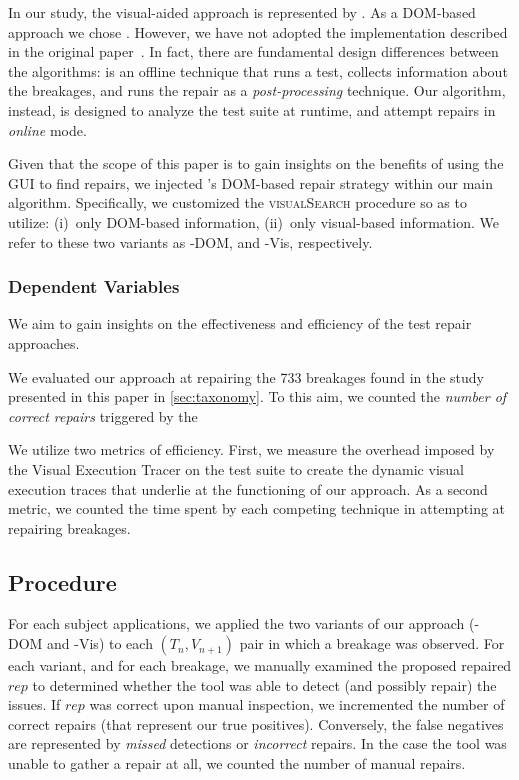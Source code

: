 In our study, the visual-aided approach is represented by \tool. As a DOM-based approach we chose \water. However, we have not adopted the implementation described in the original paper~\cite{Choudhary:2011:WWA:2002931.2002935}. In fact, there are fundamental design differences between the algorithms: \water is an offline technique that runs a test, collects information about the breakages, and runs the repair as a \textit{post-processing} technique. Our algorithm, instead, is designed to analyze the test suite at runtime, and attempt repairs in \textit{online} mode. %

Given that the scope of this paper is to gain insights on the benefits of using the GUI to find repairs, we injected \water's DOM-based repair strategy within our main algorithm. Specifically, we customized the \textsc{visualSearch} procedure so as to utilize: (i)~only DOM-based information, (ii)~only visual-based information. We refer to these two variants as \tool-DOM, and \tool-Vis, respectively.

\subsubsection{Dependent Variables}

We aim to gain insights on the effectiveness and efficiency of the test repair approaches.

We evaluated our approach at repairing the 733 breakages found in the study presented in this paper in \autoref{sec:taxonomy}.
To this aim, we counted the \textit{number of correct repairs} triggered by the 

We utilize two metrics of efficiency.
First, we measure the overhead imposed by the Visual Execution Tracer on the test suite to create the dynamic visual execution traces that underlie at the functioning of our approach.
As a second metric, we counted the time spent by each competing technique in attempting at repairing breakages. 

\subsection{Procedure}\label{sec:procedure}

For each subject applications, we applied the two variants of our approach (\tool-DOM and \tool-Vis) to each $(T_n,V_{n+1})$ pair in which a breakage was observed. For each variant, and for each breakage, we manually examined the proposed repaired $rep$ to determined whether the tool was able to detect (and possibly repair) the issues. If $rep$ was correct upon manual inspection, we incremented the number of correct repairs (that represent our true positives). Conversely, the false negatives are represented by \textit{missed} detections or \textit{incorrect} repairs.
In the case the tool was unable to gather a repair at all, we counted the number of manual repairs.

